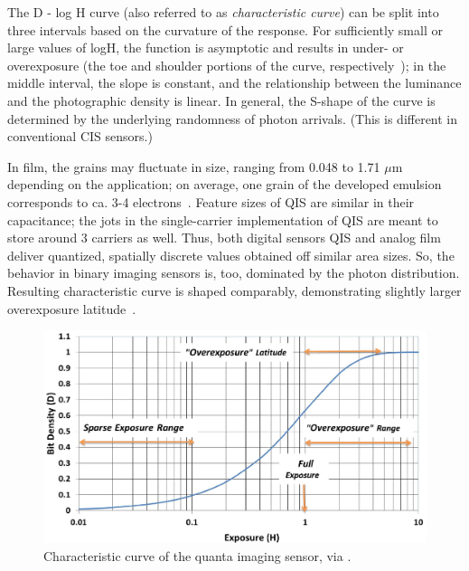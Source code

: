 The D - log H curve (also referred to as \textit{ characteristic curve}) can be split into three intervals based on the curvature of the response. For sufficiently small or large values of logH, the function is asymptotic and results in under- or overexposure (the toe and shoulder portions of the curve, respectively~\cite{Hunt2005}); in the middle interval, the slope is constant, and the relationship between the luminance and the photographic density is linear. %
In general, the S-shape of the curve is determined by the underlying randomness of photon arrivals. (This is different in conventional CIS sensors.)

In film, the grains may fluctuate in size, ranging from 0.048 to 1.71 $\mu$m depending on the application; on average, one grain of the developed emulsion corresponds to ca. 3-4 electrons~\cite{Carroll1980, FossumSiMulQIS}. Feature sizes of QIS are similar in their capacitance; the jots in the single-carrier implementation of QIS are meant to store around 3 carriers as well. Thus, both digital sensors QIS and analog film deliver quantized, spatially discrete values obtained off similar area sizes. So, the behavior in binary imaging sensors is, too, dominated by the photon distribution. Resulting characteristic curve is shaped comparably, demonstrating slightly larger overexposure latitude~\cite{FossumSiMulQIS}.

\begin{figure}[h]
  \centering
  \includegraphics[width=\linewidth]{imgs/qiscurve.png}
  \caption{Characteristic curve of the quanta imaging sensor, via \cite{fossum2016quanta}.}
  \label{fig:qiscurve}
\end{figure}

